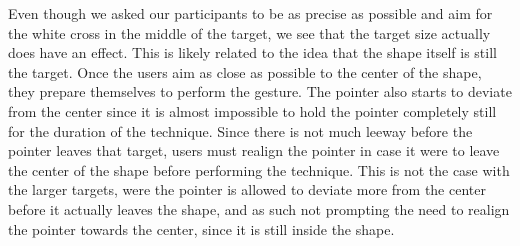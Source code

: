 Even though we asked our participants to be as precise as possible and aim for the white cross in the middle of the target, we see that the target size actually does have an effect.
This is likely related to the idea that the shape itself is still the target. 
Once the users aim as close as possible to the center of the shape, they prepare themselves to perform the gesture. 
The pointer also starts to deviate from the center since it is almost impossible to hold the pointer completely still for the duration of the technique.
Since there is not much leeway before the pointer leaves that target, users must realign the pointer in case it were to leave the center of the shape before performing the technique.
This is not the case with the larger targets, were the pointer is allowed to deviate more from the center before it actually leaves the shape, and as such not prompting the need to realign the pointer towards the center, since it is still inside the shape. 
